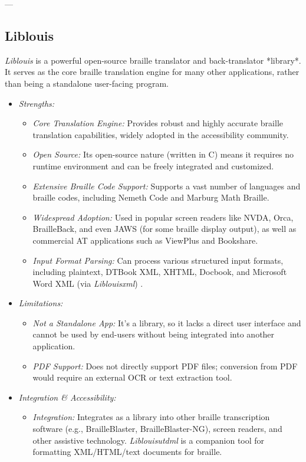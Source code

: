 ---

\subsection{Liblouis}
\emph{Liblouis} is a powerful open-source braille translator and back-translator *library*. It serves as the core braille translation engine for many other applications, rather than being a standalone user-facing program.

\begin{itemize}
    \item \emph{Strengths:}
    \begin{itemize}
        \item \emph{Core Translation Engine:} Provides robust and highly accurate braille translation capabilities, widely adopted in the accessibility community.
        \item \emph{Open Source:} Its open-source nature (written in C) means it requires no runtime environment and can be freely integrated and customized.
        \item \emph{Extensive Braille Code Support:} Supports a vast number of languages and braille codes, including Nemeth Code and Marburg Math Braille.
        \item \emph{Widespread Adoption:} Used in popular screen readers like NVDA, Orca, BrailleBack, and even JAWS (for some braille display output), as well as commercial AT applications such as ViewPlus and Bookshare.
        \item \emph{Input Format Parsing:} Can process various structured input formats, including plaintext, DTBook XML, XHTML, Docbook, and Microsoft Word XML (via \emph{Liblouisxml}) \cite{Liblouis}.
    \end{itemize}
    \item \emph{Limitations:}
    \begin{itemize}
        \item \emph{Not a Standalone App:} It's a library, so it lacks a direct user interface and cannot be used by end-users without being integrated into another application.
        \item \emph{PDF Support:} Does not directly support PDF files; conversion from PDF would require an external OCR or text extraction tool.
    \end{itemize}
    \item \emph{Integration \& Accessibility:}
    \begin{itemize}
        \item \emph{Integration:} Integrates as a library into other braille transcription software (e.g., BrailleBlaster, BrailleBlaster-NG), screen readers, and other assistive technology. \emph{Liblouisutdml} is a companion tool for formatting XML/HTML/text documents for braille.

\end{itemize}
\end{itemize}
